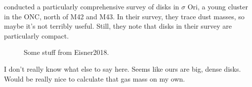\citet{Eisner2018} conducted a particularly comprehensive survey of disks in $\sigma$ Ori, a young cluster in the ONC, north of M42 and M43. In their survey, they trace dust masses, so maybe it's not terribly useful. Still, they note that disks in their survey are particularly compact.


\begin{figure}[h!]
  \centering
    \hspace*{\fill}%
    \hspace*{\fill}%
    \caption{Some stuff from Eisner2018.}
    \label{fig:bf_disk_strs}
\end{figure}




I don't really know what else to say here. Seems like ours are big, dense disks. Would be really nice to calculate that gas mass on my own.








%
%
%











